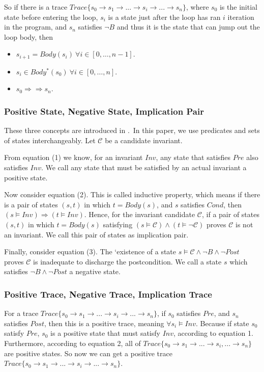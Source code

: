 So if there is a trace $Trace\{s_0 \to s_1 \to ...\to s_i \to ... \to s_n\}$, 
where $s_0$ is the initial state before entering the loop, 
$s_i$ is a state just after the loop has ran $i$ iteration in the program,
and $s_n$ satisfies $\neg B$ and thus it is the state that can jump out the loop body,
then 
\begin{itemize}
\item $s_{i+1} = Body(s_i)\ \forall i \in [0, \ldots, n-1]$.
\item $s_{i} \in Body^*(s_0)\ \forall i \in [0, \ldots, n]$.
\item $s_{0} \Rightarrow\Rightarrow s_{n}$.
\end{itemize}



\subsubsection{Positive State, Negative State, Implication Pair}
These three concepts are introduced in \cite{sharma2014invariant}.\
In this paper, we use predicates and sets of states interchangeably.
Let $\mathcal{C}$ be a candidate invariant.

From equation (1) we know, for an invariant $Inv$, 
any state that satisfies $Pre$ also satisfies $Inv$. 
We call any state that must be satisfied by an actual invariant a positive state. 


Now consider equation (2).
This is called inductive property, which means if there is a pair of states $(s, t)$ in which $t = Body(s)$, 
and $s$ satisfies $Cond$, then $(s \models Inv) \Rightarrow (t \models {Inv})$. 
Hence, for the invariant candidate $\mathcal{C}$, 
if a pair of states $(s, t)$ in which $t = Body(s)$ satisfying $(s \models \mathcal{C}) \land (t \models \neg \mathcal{C})$ proves $\mathcal{C}$ is not an invariant. 
We call this pair of states as implication pair.

Finally, consider equation (3).
The `existence of a state $s \models \mathcal{C} \wedge \neg B \wedge \neg Post$ proves $\mathcal{C}$ is inadequate to discharge the postcondition. 
We call a state $s$ which satisfies $\neg{B} \land \neg{Post}$ a negative state. 



\subsubsection{Positive Trace, Negative Trace, Implication Trace}
For a trace $Trace\{s_0 \to s_1 \to ... \to s_i \to ... \to s_n\}$, 
if $s_0$ satisfies $Pre$, and $s_n$ satisfies $Post$,
then this is a positive trace, meaning $\forall s_i \models Inv$.
Because if state $s_0$ satisfy $Pre$,
$s_0$ is a positive state that must satisfy $Inv$, according to equation 1.
Furthermore, according to equation 2,
all of $Trace\{s_0 \to s_1 \to ...\to s_i, ... \to s_n\}$ are positive states.
So now we can get a positive trace  $Trace\{s_0 \to s_1 \to ...\to s_i \to ... \to s_n\}$.

